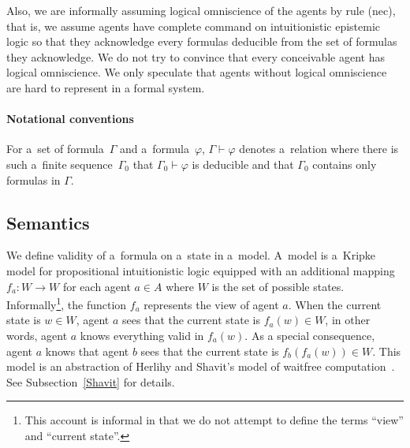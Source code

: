 Also, 
we are informally
assuming logical omniscience of the agents by rule (nec),
 that is, we assume agents have complete
command on intuitionistic epistemic logic so that they acknowledge every formulas
deducible from the set of formulas they acknowledge.
We do not try to convince that every conceivable agent has logical omniscience.
We only speculate that agents without logical omniscience are hard to represent in a
formal system.

\paragraph{Notational conventions}
For a~set of formula~$\Gamma$ and a~formula~$\varphi$, $\Gamma\vdash
\varphi$ denotes a~relation where
there is such a~finite sequence~$\Gamma_0$ that 
$\Gamma_0\vdash
\varphi$ is deducible and that $\Gamma_0$ contains only formulas in $\Gamma$.

\subsection{Semantics}
We define validity of a~formula on a~state in a~model.
A~model is a~Kripke model for propositional intuitionistic logic
equipped with an additional
mapping $f_a: W\rightarrow W$ for each agent $a\in A$ where $W$ is the
set of possible states.
Informally\footnote{This account is informal in that we do not attempt to
define the terms ``view'' and ``current state''.},
 the function $f_a$ represents the view of agent
$a$.
When the current state is $w\in W$\kern -2pt, agent $a$ sees that the current state is
$f_a(w)\in W$, in other words, agent $a$ knows everything valid in $f_a(w)$.
As a special consequence, agent $a$ knows that agent $b$ sees that the current state
is
$f_b(f_a(w))\in W$\kern -2pt.
This model is an abstraction of Herlihy and Shavit's model of waitfree
computation~\cite{herlihy1999topological}.
See Subsection~\ref{Shavit} for details.

